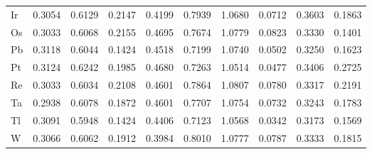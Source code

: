 \begin{table}[htbp]
{\begin{tabular}{l *{9}{l}}
      Ir & 0.3054 & 0.6129 & 0.2147 & 0.4199 & 0.7939 & 1.0680 & 0.0712 & 0.3603 & 0.1863 \\
      Os & 0.3033 & 0.6068 & 0.2155 & 0.4695 & 0.7674 & 1.0779 & 0.0823 & 0.3330 & 0.1401 \\
      Pb & 0.3118 & 0.6044 & 0.1424 & 0.4518 & 0.7199 & 1.0740 & 0.0502 & 0.3250 & 0.1623 \\
      Pt & 0.3124 & 0.6242 & 0.1985 & 0.4680 & 0.7263 & 1.0514 & 0.0477 & 0.3406 & 0.2725 \\
      Re & 0.3033 & 0.6034 & 0.2108 & 0.4601 & 0.7864 & 1.0807 & 0.0780 & 0.3317 & 0.2191 \\
      Ta & 0.2938 & 0.6078 & 0.1872 & 0.4601 & 0.7707 & 1.0754 & 0.0732 & 0.3243 & 0.1783 \\
      Tl & 0.3091 & 0.5948 & 0.1424 & 0.4406 & 0.7123 & 1.0568 & 0.0342 & 0.3173 & 0.1569 \\
      W  & 0.3066 & 0.6062 & 0.1912 & 0.3984 & 0.8010 & 1.0777 & 0.0787 & 0.3333 & 0.1815 \\
      \bottomrule
    \end{tabular}
  }
\end{table}

